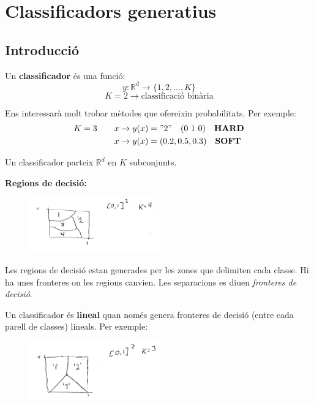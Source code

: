 \chapter{Classificadors generatius}
\section{Introducció}

Un \textbf{classificador} és una funció:
$$
y:\mathbb{R}^d \rightarrow \{ 1,2,...,K \}
$$
$$
K = 2 \rightarrow \text{classificació binària}
$$

Ens interessarà molt trobar mètodes que ofereixin probabilitats. Per exemple:
\begin{align*}
	K = 3 \qquad &x \rightarrow y(x) = "2" \quad (0\ 1\ 0) \quad \text{\textbf{HARD}}\\
	& x \rightarrow y(x) = (0.2, 0.5, 0.3) \quad \text{\textbf{SOFT}}
\end{align*}

Un classificador parteix $\mathbb{R}^d$ en $K$ subconjunts. 

\textbf{Regions de decisió:}

\begin{figure}[H]
	\centering
	\includegraphics[width=0.5\textwidth]{tema_5/images/tema_5-1}
\end{figure}

Les regions de decisió estan generades per les zones que delimiten cada classe. Hi ha unes fronteres on les regions canvien. Les separacions es diuen \emph{fronteres de decisió}.

Un classificador és \textbf{lineal} quan només genera fronteres de decisió (entre cada parell de classes) lineals. Per exemple:

\begin{figure}[H]
	\centering
	\includegraphics[width=0.5\textwidth]{tema_5/images/tema_5-2}
\end{figure}

